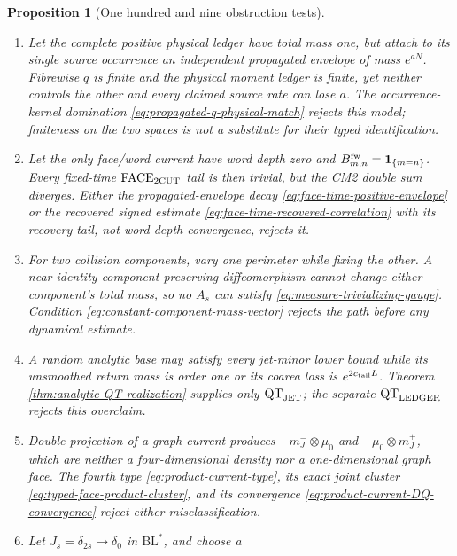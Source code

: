 \documentclass[11pt]{article}
\newtheorem{proposition}[theorem]{Proposition}
\newcommand{\one}{\mathbf 1}
\begin{document}
\begin{proposition}[One hundred and nine obstruction tests]
\begin{enumerate}[label=\textup{(T\arabic*)}]
      component choice is non-Borel.  Then neither the marked kernel nor
      Tonelli assembly is defined.  The standard-Borel measurable component
      extension in Definition~\ref{lem:measurable-positive-decomposition} rejects
      this model before any signed recombination.
\item Let the complete positive physical ledger have total mass one, but
      attach to its single source occurrence an independent propagated
      envelope of mass $e^{aN}$.  Fibrewise $q$ is finite and the physical
      moment ledger is finite, yet neither controls the other and every
      claimed source rate can lose $a$.  The occurrence-kernel domination
      \eqref{eq:propagated-q-physical-match} rejects this model; finiteness on
      the two spaces is not a substitute for their typed identification.
\item Let the only face/word current have word depth zero and
      $B_{m,n}^{\rm fw}=\one_{\{m=n\}}$.  Every fixed-time
      $\mathrm{FACE}_{\rm 2CUT}$ tail is then trivial, but the CM2 double sum
      diverges.  Either the propagated-envelope decay
      \eqref{eq:face-time-positive-envelope} or the recovered signed estimate
      \eqref{eq:face-time-recovered-correlation} with its recovery tail,
      not word-depth convergence, rejects it.
\item For two collision components, vary one perimeter while fixing the
      other.  A near-identity component-preserving diffeomorphism cannot
      change either component's total mass, so no $A_s$ can satisfy
      \eqref{eq:measure-trivializing-gauge}.  Condition
      \eqref{eq:constant-component-mass-vector} rejects the path before any
      dynamical estimate.
\item A random analytic base may satisfy every jet-minor lower bound while
      its unsmoothed return mass is order one or its coarea loss is
      $e^{2c_{\rm tail}L}$.  Theorem
      \ref{thm:analytic-QT-realization} supplies only
      $\mathrm{QT}_{\rm JET}$; the separate
      $\mathrm{QT}_{\rm LEDGER}$ rejects this overclaim.
\item Double projection of a graph current produces
      $-m_J^-\otimes\mu_0$ and $-\mu_0\otimes m_J^+$, which are neither a
      four-dimensional density nor a one-dimensional graph face.  The fourth
      type \eqref{eq:product-current-type}, its exact joint cluster
      \eqref{eq:typed-face-product-cluster}, and its convergence
      \eqref{eq:product-current-DQ-convergence} reject either
      misclassification.
\item Let $J_s=\delta_{2s}\to\delta_0$ in $\mathrm{BL}^*$, and choose a

\end{enumerate}
\end{proposition}
\end{document}
